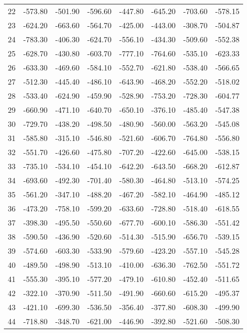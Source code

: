 \begin{longtable}{rrrrrrrr}
22 & -573.80 & -501.90 & -596.60 & -447.80 & -645.20 & -703.60 & -578.15  \\
23 & -624.20 & -663.60 & -564.70 & -425.00 & -443.00 & -308.70 & -504.87  \\
24 & -783.30 & -406.30 & -624.70 & -556.10 & -434.30 & -509.60 & -552.38  \\
25 & -628.70 & -430.80 & -603.70 & -777.10 & -764.60 & -535.10 & -623.33  \\
26 & -633.30 & -469.60 & -584.10 & -552.70 & -621.80 & -538.40 & -566.65  \\
27 & -512.30 & -445.40 & -486.10 & -643.90 & -468.20 & -552.20 & -518.02  \\
28 & -533.40 & -624.90 & -459.90 & -528.90 & -753.20 & -728.30 & -604.77  \\
29 & -660.90 & -471.10 & -640.70 & -650.10 & -376.10 & -485.40 & -547.38  \\
30 & -729.70 & -438.20 & -498.50 & -480.90 & -560.00 & -563.20 & -545.08  \\
31 & -585.80 & -315.10 & -546.80 & -521.60 & -606.70 & -764.80 & -556.80  \\
32 & -551.70 & -426.60 & -475.80 & -707.20 & -422.60 & -645.00 & -538.15  \\
33 & -735.10 & -534.10 & -454.10 & -642.20 & -643.50 & -668.20 & -612.87  \\
34 & -693.60 & -492.30 & -701.40 & -580.30 & -464.80 & -513.10 & -574.25  \\
35 & -561.20 & -347.10 & -488.20 & -467.20 & -582.10 & -464.90 & -485.12  \\
36 & -473.20 & -758.10 & -599.20 & -633.60 & -728.80 & -518.40 & -618.55  \\
37 & -398.30 & -495.50 & -550.60 & -677.70 & -600.10 & -586.30 & -551.42  \\
38 & -590.50 & -436.90 & -520.60 & -514.30 & -515.90 & -656.70 & -539.15  \\
39 & -574.60 & -603.30 & -533.90 & -579.60 & -423.20 & -557.10 & -545.28  \\
40 & -489.50 & -498.90 & -513.10 & -410.00 & -636.30 & -762.50 & -551.72  \\
41 & -555.30 & -395.10 & -577.20 & -479.10 & -610.80 & -452.40 & -511.65  \\
42 & -322.10 & -370.90 & -511.50 & -491.90 & -660.60 & -615.20 & -495.37  \\
43 & -421.10 & -699.30 & -536.50 & -356.40 & -377.80 & -608.30 & -499.90  \\
44 & -718.80 & -348.70 & -621.00 & -446.90 & -392.80 & -521.60 & -508.30  \\

\end{longtable}
